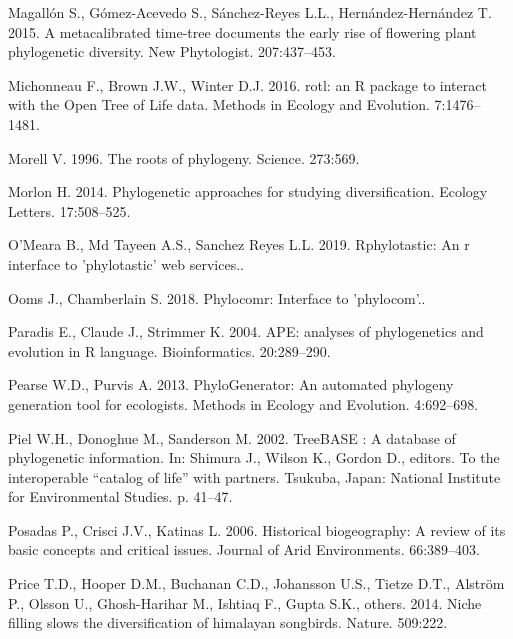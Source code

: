 \documentclass[]{article}
\begin{document}
\leavevmode\hypertarget{ref-magallon2015metacalibrated}{}%
Magallón S., Gómez-Acevedo S., Sánchez-Reyes L.L., Hernández-Hernández T. 2015. A metacalibrated time-tree documents the early rise of flowering plant phylogenetic diversity. New Phytologist. 207:437--453.

\leavevmode\hypertarget{ref-Michonneau2016}{}%
Michonneau F., Brown J.W., Winter D.J. 2016. rotl: an R package to interact with the Open Tree of Life data. Methods in Ecology and Evolution. 7:1476--1481.

\leavevmode\hypertarget{ref-morell1996roots}{}%
Morell V. 1996. The roots of phylogeny. Science. 273:569.

\leavevmode\hypertarget{ref-Morlon2014}{}%
Morlon H. 2014. Phylogenetic approaches for studying diversification. Ecology Letters. 17:508--525.

\leavevmode\hypertarget{ref-Omeara2019}{}%
O'Meara B., Md Tayeen A.S., Sanchez Reyes L.L. 2019. Rphylotastic: An r interface to 'phylotastic' web services..

\leavevmode\hypertarget{ref-Ooms2018}{}%
Ooms J., Chamberlain S. 2018. Phylocomr: Interface to 'phylocom'..

\leavevmode\hypertarget{ref-Paradis2004}{}%
Paradis E., Claude J., Strimmer K. 2004. APE: analyses of phylogenetics and evolution in R language. Bioinformatics. 20:289--290.

\leavevmode\hypertarget{ref-pearse2013phylogenerator}{}%
Pearse W.D., Purvis A. 2013. PhyloGenerator: An automated phylogeny generation tool for ecologists. Methods in Ecology and Evolution. 4:692--698.

\leavevmode\hypertarget{ref-Piel2002}{}%
Piel W.H., Donoghue M., Sanderson M. 2002. TreeBASE : A database of phylogenetic information. In: Shimura J., Wilson K., Gordon D., editors. To the interoperable ``catalog of life'' with partners. Tsukuba, Japan: National Institute for Environmental Studies. p. 41--47.

\leavevmode\hypertarget{ref-posadas2006historical}{}%
Posadas P., Crisci J.V., Katinas L. 2006. Historical biogeography: A review of its basic concepts and critical issues. Journal of Arid Environments. 66:389--403.

\leavevmode\hypertarget{ref-price2014niche}{}%
Price T.D., Hooper D.M., Buchanan C.D., Johansson U.S., Tietze D.T., Alström P., Olsson U., Ghosh-Harihar M., Ishtiaq F., Gupta S.K., others. 2014. Niche filling slows the diversification of himalayan songbirds. Nature. 509:222.
\end{document}

